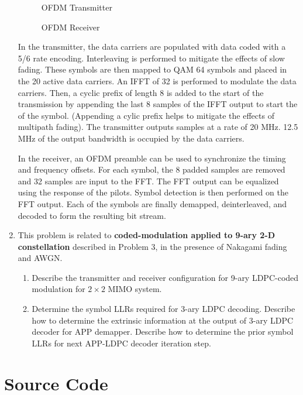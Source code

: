 \documentclass[fleqn]{article}
\begin{document}
\begin{enumerate}
		\begin{figure}[H]
			\centerline{}
			\caption{OFDM Transmitter}
			\label{fig::ofdm_tx_config}
		\end{figure}
		
		\begin{figure}[H]
			\centerline{}
			\caption{OFDM Receiver}
			\label{fig::ofdm_rx_config}
		\end{figure}
		
		In the transmitter, the data carriers are populated with data coded with a 5/6 rate encoding. Interleaving is performed to mitigate the effects of slow fading. These symbols are then mapped to QAM 64 symbols and placed in the 20 active data carriers. An IFFT of 32 is performed to modulate the data carriers. Then, a cyclic prefix of length 8 is added to the start of the transmission by appending the last 8 samples of the IFFT output to start the of the symbol. (Appending a cylic prefix helps to mitigate the effects of multipath fading). The transmitter outputs samples at a rate of 20 MHz. 12.5 MHz of the output bandwidth is occupied by the data carriers.
		
		In the receiver, an OFDM preamble can be used to synchronize the timing and frequency offsets. For each symbol, the 8 padded samples are removed and 32 samples are input to the FFT. The FFT output can be equalized using the response of the pilots. Symbol detection is then performed on the FFT output. Each of the symbols are finally demapped, deinterleaved, and decoded to form the resulting bit stream.
		
		\item This problem is related to \textbf{coded-modulation applied to 9-ary 2-D constellation} described in Problem 3, in the presence of Nakagami fading and AWGN.
		
		\begin{enumerate}
			\item Describe the transmitter and receiver configuration for 9-ary LDPC-coded modulation for $2\times 2$ MIMO system.
			
			\item Determine the symbol LLRs required for 3-ary LDPC decoding. Describe how to determine the extrinsic information at the output of 3-ary LDPC decoder for APP demapper. Describe how to determine the prior symbol LLRs for next APP-LDPC decoder iteration step.
		\end{enumerate}
	\end{enumerate}
	
	\pagebreak
	\appendix
	\section{Source Code}
	\label{source_code}
	\lstset{style=Matlab-editor,basicstyle=\ttfamily\footnotesize}
	
	\raggedbottom
\end{document}
